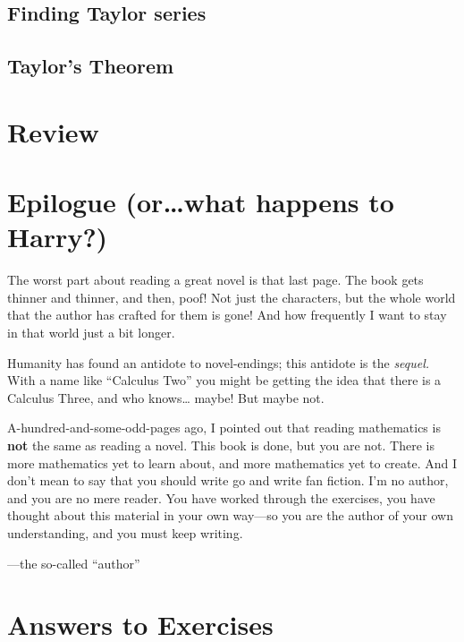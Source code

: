 \documentclass[justified]{tufte-book}
\begin{document}
\section{Finding Taylor series}
\label{section:finding-taylor-series}


\section{Taylor's Theorem}


\chapter*{Review}


 \chapter*{Epilogue (or\ldots what happens to Harry?)}

 The worst part about reading a great
 novel is that last page.  The book gets thinner and thinner, and
 then, poof!  Not just the characters, but the whole world that the
 author has crafted for them is gone!  And how frequently I want to
 stay in that world just a bit longer.

 Humanity has found an antidote to novel-endings; this antidote is the
 \textit{sequel.}  With a name like ``Calculus Two'' you might be
 getting the idea that there is a Calculus Three, and who knows\ldots
 maybe!  But maybe not.

 A-hundred-and-some-odd-pages ago, I pointed out
 that reading mathematics is \textbf{not} the same as reading a novel.
 This book is done, but you are not.  There is more mathematics yet to
 learn about, and more mathematics yet to create.  And I don't mean to
 say that you should write go and write fan fiction.  I'm no author,
 and you are no mere reader.  You have worked through the exercises,
 you have thought about this material in your own way---so you are the
 author of your own understanding, and you must keep writing.

\vspace{0.5in}
\hfill---the so-called ``author''

%
%

\finalizeanswers
\chapter*{Answers to Exercises}
\small
{}
\normalsize
\backmatter

\printindex
\end{document}
